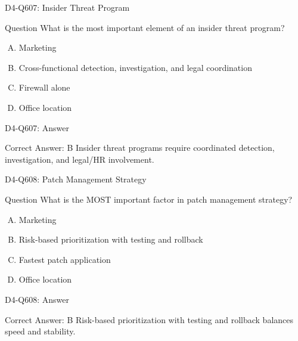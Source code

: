 \documentclass{beamer}
\begin{document}
	\begin{frame}{D4-Q607: Insider Threat Program}
		\begin{block}{Question}
			What is the most important element of an insider threat program?
		\end{block}
		\begin{enumerate}[(A)]
			\item Marketing
			\item Cross-functional detection, investigation, and legal coordination
			\item Firewall alone
			\item Office location
		\end{enumerate}
	\end{frame}
	\begin{frame}{D4-Q607: Answer}
		\begin{block}{Correct Answer: B}
			Insider threat programs require coordinated detection, investigation, and legal/HR involvement.
		\end{block}
	\end{frame}
	
	\begin{frame}{D4-Q608: Patch Management Strategy}
		\begin{block}{Question}
			What is the MOST important factor in patch management strategy?
		\end{block}
		\begin{enumerate}[(A)]
			\item Marketing
			\item Risk-based prioritization with testing and rollback
			\item Fastest patch application
			\item Office location
		\end{enumerate}
	\end{frame}
	\begin{frame}{D4-Q608: Answer}
		\begin{block}{Correct Answer: B}
			Risk-based prioritization with testing and rollback balances speed and stability.
		\end{block}
	\end{frame}
	
\end{document}
